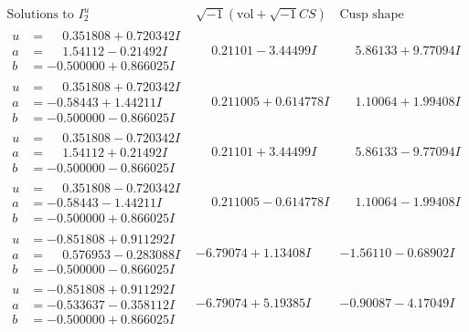 \documentclass[1p]{elsarticle_modified}
\theoremstyle{definition}
\newcommand{\I}{\sqrt{-1}}
\begin{document}
$$\begin{array}{c|c|c}  
\text{Solutions to }I^u_{2}& \I (\text{vol} + \sqrt{-1}CS) & \text{Cusp shape}\\
 \hline 
\begin{aligned}
u &= \phantom{-}0.351808 + 0.720342 I \\
a &= \phantom{-}1.54112 - 0.21492 I \\
b &= -0.500000 + 0.866025 I\end{aligned}
 & \phantom{-}0.21101 - 3.44499 I & \phantom{-}5.86133 + 9.77094 I \\ \hline\begin{aligned}
u &= \phantom{-}0.351808 + 0.720342 I \\
a &= -0.58443 + 1.44211 I \\
b &= -0.500000 - 0.866025 I\end{aligned}
 & \phantom{-}0.211005 + 0.614778 I & \phantom{-}1.10064 + 1.99408 I \\ \hline\begin{aligned}
u &= \phantom{-}0.351808 - 0.720342 I \\
a &= \phantom{-}1.54112 + 0.21492 I \\
b &= -0.500000 - 0.866025 I\end{aligned}
 & \phantom{-}0.21101 + 3.44499 I & \phantom{-}5.86133 - 9.77094 I \\ \hline\begin{aligned}
u &= \phantom{-}0.351808 - 0.720342 I \\
a &= -0.58443 - 1.44211 I \\
b &= -0.500000 + 0.866025 I\end{aligned}
 & \phantom{-}0.211005 - 0.614778 I & \phantom{-}1.10064 - 1.99408 I \\ \hline\begin{aligned}
u &= -0.851808 + 0.911292 I \\
a &= \phantom{-}0.576953 - 0.283088 I \\
b &= -0.500000 - 0.866025 I\end{aligned}
 & -6.79074 + 1.13408 I & -1.56110 - 0.68902 I \\ \hline\begin{aligned}
u &= -0.851808 + 0.911292 I \\
a &= -0.533637 - 0.358112 I \\
b &= -0.500000 + 0.866025 I\end{aligned}
 & -6.79074 + 5.19385 I & -0.90087 - 4.17049 I \\ \hline\begin{aligned}

\end{aligned}
\end{array}$$
\end{document}
